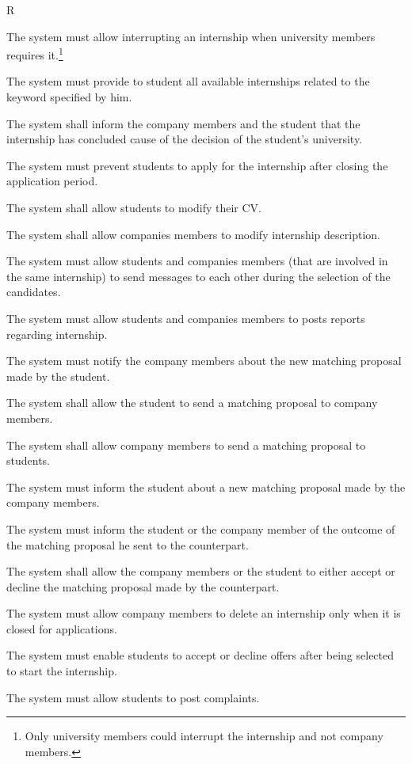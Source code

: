 \begin{listInSquareBrackets}{R}
    \item The system must allow interrupting an internship when university members requires it.\footnote{Only university members could interrupt the internship and not company members.}
    \item The system must provide to student all available internships related to the keyword specified by him.
    \item The system shall inform the company members and the student that the internship has concluded cause of the decision of the student's university.
    \item The system must prevent students to apply for the internship after closing the application period. 
    \item The system shall allow students to modify their CV.
    \item The system shall allow companies members to modify internship description.
    \item The system must allow students and companies members (that are involved in the same internship) to send messages to each other during the selection of the candidates.
    \item The system must allow students and companies members to posts reports regarding internship.
    \item The system must notify the company members about the new matching proposal made by the student.
    \item The system shall allow the student to send a matching proposal to company members.
    \item The system shall allow company members to send a matching proposal to students.
    \item The system must inform the student about a new matching proposal made by the company members.
    \item The system must inform the student or the company member of the outcome of the matching proposal he sent to the counterpart.
    \item The system shall allow the company members or the student to either accept or decline the matching proposal made by the counterpart.
    \item The system must allow company members to delete an internship only when it is closed for applications.
    \item The system must enable students to accept or decline offers after being selected to start the internship.
    \item The system must allow students to post complaints.
\end{listInSquareBrackets}

